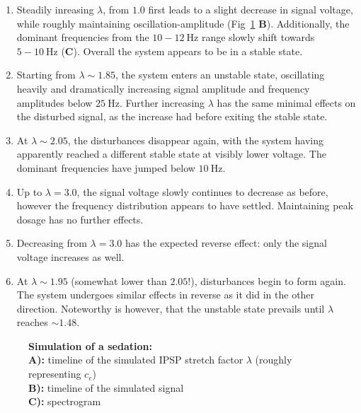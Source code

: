 \begin{enumerate}
    \item Steadily inreasing $ \lambda $, from $1.0$ first leads to a slight decrease in signal voltage, while roughly
    maintaining
    oscillation-amplitude (Fig~\ref{fig:sedation_sim} \textbf{B}).
    Additionally, the dominant frequencies from the $ 10-12 \SI{}{\hertz} $ range slowly shift towards $ 5-10
    \SI{}{\hertz} $ (\textbf{C}).
    Overall the system appears to be in a stable state.

    \item Starting from $ \lambda \sim 1.85 $, the system enters an unstable state, oscillating heavily and dramatically
    increasing signal amplitude and frequency amplitudes below $ \SI{25}{\hertz} $.
    Further increasing $\lambda$ has the same minimal effects on the disturbed signal,
    as the increase had before exiting the stable state.

    \item At $\lambda \sim 2.05 $, the disturbances disappear again, with the system having apparently reached a different
    stable state at visibly lower voltage.
    The dominant frequencies have jumped below $\SI{10}{\hertz}$.

    \item Up to $\lambda = 3.0$, the signal voltage slowly continues to decrease as before,
    however the frequency distribution appears to have settled.
    Maintaining peak dosage has no further effects.

    \item Decreasing from $\lambda = 3.0$ has the expected reverse effect: only the signal voltage increases as well.

    \item At $\lambda \sim 1.95$ (somewhat lower than $2.05$!), disturbances begin to form again.
    The system undergoes similar effects in reverse as it did in the other direction.
    Noteworthy is however, that the unstable state prevails until $\lambda$ reaches $\sim 1.48$.
\end{enumerate}




\begin{figure}[H]

\caption{\textbf{Simulation of a sedation:} \\
        \textbf{A):} timeline of the simulated IPSP stretch factor $\lambda$ (roughly representing $c_e$) \\
        \textbf{B):} timeline of the simulated signal \\
        \textbf{C):} spectrogram
}\label{fig:sedation_sim}
\end{figure}


